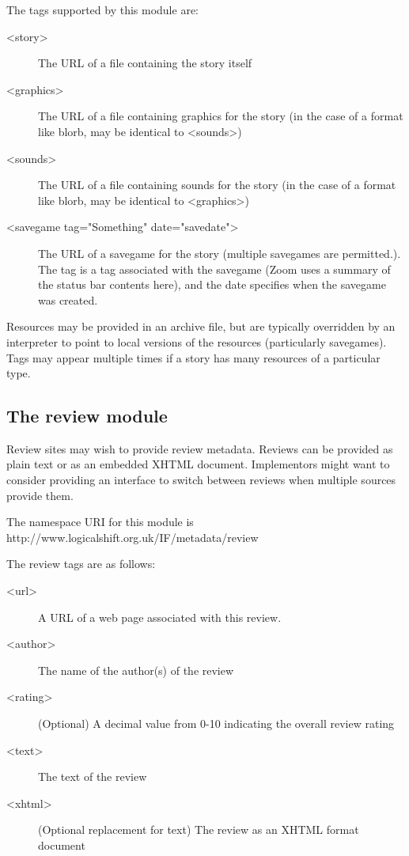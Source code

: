 \documentclass[a4paper,11pt]{article}
\begin{document}
The tags supported by this module are:

\begin{description}
\item[<story>] The URL of a file containing the story itself
\item[<graphics>] The URL of a file containing graphics for the story (in the case of a format like blorb, may be identical to <sounds>)
\item[<sounds>] The URL of a file containing sounds for the story (in the case of a format like blorb, may be identical to <graphics>)
\item[<savegame tag="Something" date="savedate">] The URL of a savegame for the story 
(multiple savegames are permitted.). The tag is a tag associated with the savegame
(Zoom uses a summary of the status bar contents here), and the date specifies when the
savegame was created.
\end{description}

Resources may be provided in an archive file, but are typically overridden by an interpreter
to point to local versions of the resources (particularly savegames). Tags may appear multiple
times if a story has many resources of a particular type.

\subsection{The review module}

Review sites may wish to provide review metadata. Reviews can be provided as plain text
or as an embedded XHTML document. Implementors might want to consider providing
an interface to switch between reviews when multiple sources provide them. 

The namespace URI for this module is http://www.logicalshift.org.uk/IF/metadata/review

The review tags are as follows:

\begin{description}
\item[<url>] A URL of a web page associated with this review.
\item[<author>] The name of the author(s) of the review
\item[<rating>] (Optional) A decimal value from 0-10 indicating the overall review rating
\item[<text>] The text of the review
\item[<xhtml>] (Optional replacement for text) The review as an XHTML format document
\end{description}
\end{document}
